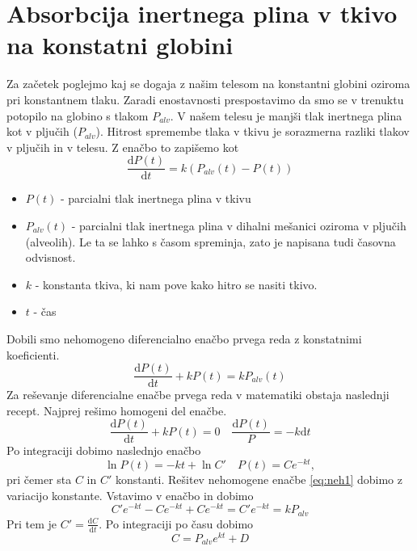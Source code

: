 \documentclass[a4paper]{article}
\begin{document}
\section{Absorbcija inertnega plina v tkivo na konstatni globini}
Za začetek poglejmo kaj se dogaja z našim telesom na
konstantni globini oziroma pri konstantnem tlaku. Zaradi enostavnosti
prespostavimo da smo se v trenuktu potopilo na globino s tlakom
$P_{alv}$.  V našem telesu je manjši tlak inertnega plina kot
v pljučih ($P_{alv}$). Hitrost spremembe tlaka v tkivu je
sorazmerna razliki tlakov v pljučih in v telesu. Z enačbo to
zapišemo kot
\begin{equation}
  \frac{\mathrm{d} P(t)}{\mathrm{d} t}=k\left(P_{alv}(t)-P(t)\right)
\end{equation} 
\begin{itemize}
\item{$P(t)$ - parcialni tlak inertnega plina v tkivu}
\item{$P_{alv}(t)$ - parcialni tlak inertnega plina v dihalni mešanici oziroma v pljučih (alveolih). Le ta se lahko s časom spreminja, zato je napisana tudi časovna odvisnost.}
\item{$k$ - konstanta tkiva, ki nam pove kako hitro se nasiti tkivo. }
\item{$t$ - čas}
\end{itemize}
Dobili smo nehomogeno diferencialno enačbo prvega reda z konstatnimi koeficienti. 
\begin{equation}
\frac{\mathrm{d} P(t)}{\mathrm{d} t}+k P(t)=k P_{alv}(t)
\label{eq:neh1}
\end{equation}
Za reševanje diferencialne enačbe prvega reda v matematiki obstaja naslednji recept. Najprej rešimo homogeni del enačbe. 
\begin{equation}
\frac{\mathrm{d} P(t)}{\mathrm{d} t}+k P(t)=0 \quad \frac{\mathrm{d} P(t)}{P} = -k\mathrm{d}t
\end{equation} 
Po integraciji dobimo naslednjo enačbo
\begin{equation}
\ln P(t)=-kt+\ln C' \quad P(t) = Ce^{-kt},
\end{equation} 
pri čemer sta $C$ in $C'$ konstanti. Rešitev nehomogene enačbe \ref{eq:neh1} dobimo z variacijo konstante.
Vstavimo v enačbo in dobimo
\begin{equation}
C'e^{-kt}-Ce^{-kt}+Ce^{-kt}=C'e^{-kt}=kP_{alv}
\end{equation} 
Pri tem je $C'=\frac{\mathrm{d} C}{\mathrm{d} t}$. Po integraciji po času dobimo
\begin{equation}
C=P_{alv}e^{kt}+D
\end{equation}
\end{document}
